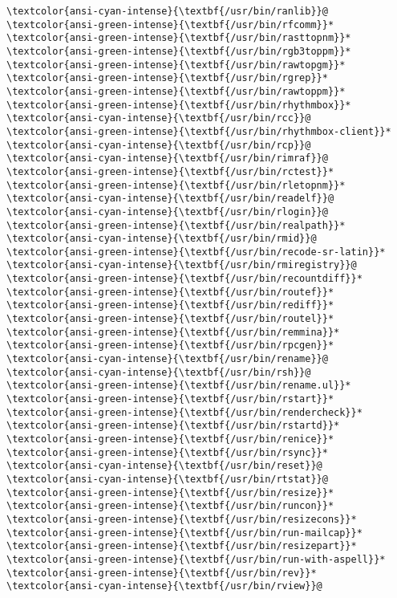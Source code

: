 \documentclass[11pt]{article}
\begin{document}
    \begin{Verbatim}[commandchars=\\\{\}]
\textcolor{ansi-cyan-intense}{\textbf{/usr/bin/ranlib}}@           \textcolor{ansi-green-intense}{\textbf{/usr/bin/rfcomm}}*
\textcolor{ansi-green-intense}{\textbf{/usr/bin/rasttopnm}}*        \textcolor{ansi-green-intense}{\textbf{/usr/bin/rgb3toppm}}*
\textcolor{ansi-green-intense}{\textbf{/usr/bin/rawtopgm}}*         \textcolor{ansi-green-intense}{\textbf{/usr/bin/rgrep}}*
\textcolor{ansi-green-intense}{\textbf{/usr/bin/rawtoppm}}*         \textcolor{ansi-green-intense}{\textbf{/usr/bin/rhythmbox}}*
\textcolor{ansi-cyan-intense}{\textbf{/usr/bin/rcc}}@              \textcolor{ansi-green-intense}{\textbf{/usr/bin/rhythmbox-client}}*
\textcolor{ansi-cyan-intense}{\textbf{/usr/bin/rcp}}@              \textcolor{ansi-cyan-intense}{\textbf{/usr/bin/rimraf}}@
\textcolor{ansi-green-intense}{\textbf{/usr/bin/rctest}}*           \textcolor{ansi-green-intense}{\textbf{/usr/bin/rletopnm}}*
\textcolor{ansi-cyan-intense}{\textbf{/usr/bin/readelf}}@          \textcolor{ansi-cyan-intense}{\textbf{/usr/bin/rlogin}}@
\textcolor{ansi-green-intense}{\textbf{/usr/bin/realpath}}*         \textcolor{ansi-cyan-intense}{\textbf{/usr/bin/rmid}}@
\textcolor{ansi-green-intense}{\textbf{/usr/bin/recode-sr-latin}}*  \textcolor{ansi-cyan-intense}{\textbf{/usr/bin/rmiregistry}}@
\textcolor{ansi-green-intense}{\textbf{/usr/bin/recountdiff}}*      \textcolor{ansi-green-intense}{\textbf{/usr/bin/routef}}*
\textcolor{ansi-green-intense}{\textbf{/usr/bin/rediff}}*           \textcolor{ansi-green-intense}{\textbf{/usr/bin/routel}}*
\textcolor{ansi-green-intense}{\textbf{/usr/bin/remmina}}*          \textcolor{ansi-green-intense}{\textbf{/usr/bin/rpcgen}}*
\textcolor{ansi-cyan-intense}{\textbf{/usr/bin/rename}}@           \textcolor{ansi-cyan-intense}{\textbf{/usr/bin/rsh}}@
\textcolor{ansi-green-intense}{\textbf{/usr/bin/rename.ul}}*        \textcolor{ansi-green-intense}{\textbf{/usr/bin/rstart}}*
\textcolor{ansi-green-intense}{\textbf{/usr/bin/rendercheck}}*      \textcolor{ansi-green-intense}{\textbf{/usr/bin/rstartd}}*
\textcolor{ansi-green-intense}{\textbf{/usr/bin/renice}}*           \textcolor{ansi-green-intense}{\textbf{/usr/bin/rsync}}*
\textcolor{ansi-cyan-intense}{\textbf{/usr/bin/reset}}@            \textcolor{ansi-cyan-intense}{\textbf{/usr/bin/rtstat}}@
\textcolor{ansi-green-intense}{\textbf{/usr/bin/resize}}*           \textcolor{ansi-green-intense}{\textbf{/usr/bin/runcon}}*
\textcolor{ansi-green-intense}{\textbf{/usr/bin/resizecons}}*       \textcolor{ansi-green-intense}{\textbf{/usr/bin/run-mailcap}}*
\textcolor{ansi-green-intense}{\textbf{/usr/bin/resizepart}}*       \textcolor{ansi-green-intense}{\textbf{/usr/bin/run-with-aspell}}*
\textcolor{ansi-green-intense}{\textbf{/usr/bin/rev}}*              \textcolor{ansi-cyan-intense}{\textbf{/usr/bin/rview}}@

    \end{Verbatim}
\end{document}
